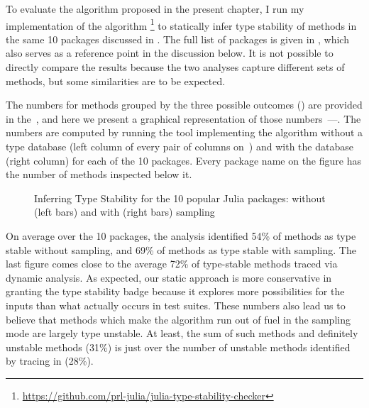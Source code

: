 To evaluate the algorithm
proposed in the present chapter, I run my implementation of the algorithm%
\footnote{\url{https://github.com/prl-julia/julia-type-stability-checker}}
to statically
infer type stability of methods in the same 10 packages discussed in
. The full list of packages is given in
, which also serves as a reference
point in the discussion below.
It is not possible to directly compare the results because the
two analyses capture different sets of methods, but some similarities are to be
expected.


The numbers for methods grouped by the three possible outcomes
() are provided in the~, and here
we present a graphical representation of those
numbers~---. The numbers are computed by running the
tool implementing the algorithm without a type database (left column of every
pair of columns on~) and with the database (right
column) for each of the 10 packages. Every package name on the figure has the number of
methods inspected below it.

\begin{figure}[ht]
  \caption{Inferring Type Stability for the 10 popular Julia packages:
  without (left bars) and with (right bars) sampling}%
\label{figs:approx:eval}
\end{figure}

On average over the 10 packages, the analysis identified 54\% of methods as type
stable without sampling, and 69\% of methods as type stable with sampling. The
last figure comes close to the average 72\% of type-stable methods traced via
dynamic analysis. As expected, our static approach is more conservative in granting the
type stability badge because it explores more possibilities for the inputs than what actually
occurs in test suites. These numbers also lead us to believe that methods which
make the algorithm run out of fuel in the sampling mode are largely type
unstable. At least, the sum of such methods and definitely unstable methods (31\%) is
just over the number of unstable methods identified by tracing in
 (28\%).

